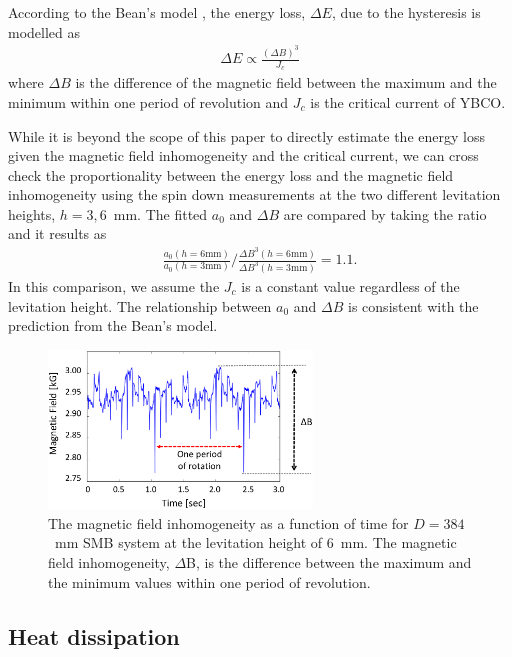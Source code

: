 \documentclass[journal]{IEEEtran}
\begin{document}
According to the Bean's model \cite{beans_model_1,beans_model_2}, the energy loss, $\Delta E$, due to the hysteresis is modelled as
\begin{eqnarray}
\Delta E \propto \frac{(\Delta B)^3}{J_c}
\label{eq:bean}
\end{eqnarray}
where $\Delta B$ is the difference of the magnetic field between the maximum and the minimum within one period of revolution and $J_c$ is the critical current of YBCO.

While it is beyond the scope of this paper to directly estimate the energy loss given the magnetic field inhomogeneity and the critical current, we can cross check the proportionality between the energy loss and the magnetic field inhomogeneity using the spin down measurements at the two different levitation heights, $h=3, 6$~mm.
The fitted $a_0$ and $\Delta B$ are compared by taking the ratio and it results as
\begin{eqnarray}
\frac{a_0(h=6\mbox{mm})}{a_0(h=3\mbox{mm})} / \frac{\Delta B^3(h=6\mbox{mm})}{\Delta B^3(h=3\mbox{mm})} = 1.1.
\label{eq:beanmodelcheck}
\end{eqnarray}
In this comparison, we assume the $J_c$ is a constant value regardless of the levitation height.
The relationship between $a_0$ and $\Delta B$ is consistent with the prediction from the Bean's model.

\begin{figure}[htb]
   \centering
   \includegraphics[width=70mm]{magneticfieldvariation_rev2.eps} %
   \caption{The magnetic field inhomogeneity as a function of time for $D=384$~mm SMB system at the levitation height of 6~mm.
     The magnetic field inhomogeneity, $\Delta$B, is the difference between the maximum and the minimum values within one period of revolution.
}
   \label{fig:Bval}
\end{figure}

\subsection{Heat dissipation}
\end{document}

